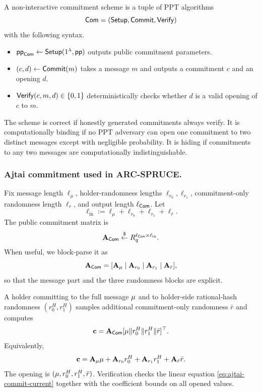 \begin{definition}\label{def:commitment-scheme}
A non-interactive commitment scheme is a tuple of PPT algorithms
\[
  \mathsf{Com}=(\mathsf{Setup},\mathsf{Commit},\mathsf{Verify})
\]
with the following syntax.
\begin{itemize}[leftmargin=1.25em]
  \item $\mathsf{pp}_{\mathsf{Com}}\gets \mathsf{Setup}(1^\lambda,\mathsf{pp})$ outputs public commitment parameters.
  \item $(c,d)\gets \mathsf{Commit}(m)$ takes a message $m$ and outputs a commitment $c$ and an opening $d$.
  \item $\mathsf{Verify}(c,m,d)\in\{0,1\}$ deterministically checks whether $d$ is a valid opening of $c$ to $m$.
\end{itemize}
The scheme is correct if honestly generated commitments always verify.  It is computationally binding if no PPT
adversary can open one commitment to two distinct messages except with negligible probability.  It is hiding if
commitments to any two messages are computationally indistinguishable.
\end{definition}

\subsubsection{Ajtai commitment used in ARC-SPRUCE.}
Fix message length $\ell_\mu$, holder-randomness lengths $\ell_{r_0},\ell_{r_1}$, commitment-only randomness length
$\ell_{\bar r}$, and output length $\ell_{\mathsf{Com}}$.  Let
\[
  \ell_{\mathrm{in}}:=\ell_\mu+\ell_{r_0}+\ell_{r_1}+\ell_{\bar r}.
\]
The public commitment matrix is
\[
  \mathbf{A}_{\mathsf{Com}}\overset{\$}{\leftarrow} R_q^{\ell_{\mathsf{Com}}\times \ell_{\mathrm{in}}}.
\]
When useful, we block-parse it as
\[
  \mathbf{A}_{\mathsf{Com}}=[\mathbf{A}_\mu\mid \mathbf{A}_{r_0}\mid \mathbf{A}_{r_1}\mid \mathbf{A}_{\bar r}],
\]
so that the message part and the three randomness blocks are explicit.

A holder committing to the full message $\mathbf{\mu}$ and to holder-side rational-hash randomness
$(r_0^H,r_1^H)$ samples additional commitment-only randomness $\bar r$ and computes
\begin{equation}
  \mathbf{c}
  =
  \mathbf{A}_{\mathsf{Com}}[\mathbf{\mu}\Vert r_0^H\Vert r_1^H\Vert \bar r]^\top.
  \label{eq:ajtai-commit-current}
\end{equation}
Equivalently,
\[
  \mathbf{c}=\mathbf{A}_\mu\mathbf{\mu}+\mathbf{A}_{r_0}r_0^H+\mathbf{A}_{r_1}r_1^H+\mathbf{A}_{\bar r}\bar r.
\]
The opening is $(\mathbf{\mu},r_0^H,r_1^H,\bar r)$.  Verification checks the linear equation
\eqref{eq:ajtai-commit-current} together with the coefficient bounds on all opened values.

